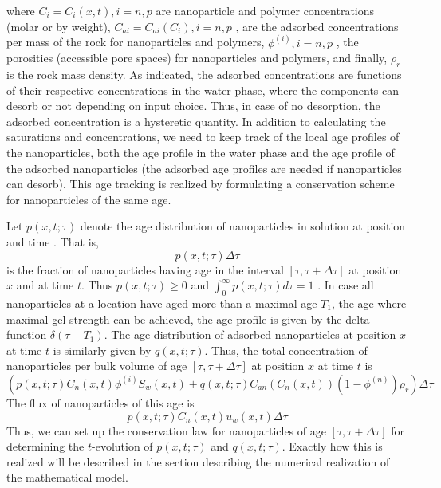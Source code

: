 where $C_i=C_i(x,t), i=n,p$ are nanoparticle and polymer concentrations (molar or by weight), $C_{ai}=C_{ai}(C_i), i=n,p$ , are the adsorbed concentrations per mass of the rock for nanoparticles and polymers, $\phi^{(i)}, i=n,p$ , the porosities (accessible pore spaces) for nanoparticles and polymers, and finally, $\rho_r$ is the rock mass density. As indicated, the adsorbed concentrations are functions of their respective concentrations in the water phase, where the components can desorb or not depending on input choice. Thus, in case of no desorption, the adsorbed concentration is a hysteretic quantity.   
In addition to calculating the saturations and concentrations, we need to keep track of the local age profiles of the nanoparticles, both the age profile in the water phase and the age profile of the adsorbed nanoparticles (the adsorbed age profiles are needed if nanoparticles can desorb). This age tracking is realized by formulating a conservation scheme for nanoparticles of the same age.   

Let  $p(x,t;\tau)$ denote the age distribution of nanoparticles in solution at position  and time  . That is, 
\begin{equation*}
    p(x,t;\tau)\Delta\tau
\end{equation*}
is the fraction of nanoparticles having age in the interval $[\tau, \tau+\Delta\tau]$  at position $x$ and at time $t$. Thus $p(x,t;\tau)\geq 0$ and $\int_{0}^{\infty}{p(x,t;\tau)d\tau}=1$ . In case all nanoparticles at a location have aged more than a maximal age $T_1$, the age where maximal gel strength can be achieved, the age profile is given by the delta function $\delta(\tau-T_1)$. The age distribution of adsorbed nanoparticles at position $x$ at time $t$ is similarly given by $q(x,t;\tau)$. Thus, the total concentration of nanoparticles per bulk volume of age  $[\tau, \tau+\Delta\tau]$ at position $x$ at time $t$ is
\begin{equation}
    \left(p(x,t;\tau)C_n(x,t)\phi^{(i)}S_w(x,t)+q(x,t;\tau)C_{an}\left(C_n(x,t)\right)(1-\phi^{(n)})\rho_r\right)\Delta\tau
\end{equation}
The flux of nanoparticles of this age is
\begin{equation}
    p(x,t;\tau)C_n(x,t)u_w(x,t)\Delta\tau
\end{equation}
Thus, we can set up the conservation law for nanoparticles of age $[\tau, \tau+\Delta\tau]$  for determining the   $t$-evolution of $p(x,t;\tau)$ and $q(x,t;\tau)$. Exactly how this is realized will be described in the section describing the numerical realization of the mathematical model.

